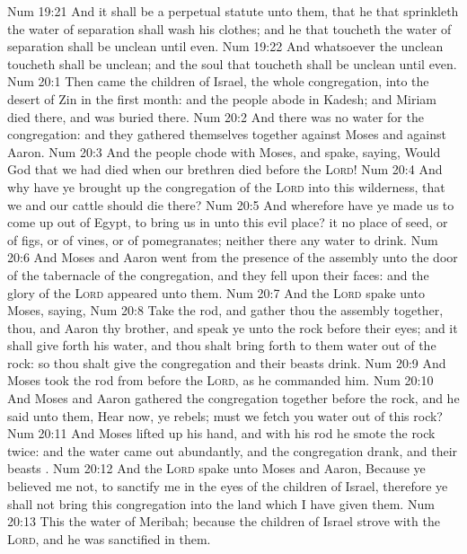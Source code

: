 \vs Num 19:21 And it shall be a perpetual statute unto them, that he that sprinkleth the water of separation shall wash his clothes; and he that toucheth the water of separation shall be unclean until even.
\vs Num 19:22 And whatsoever the unclean  toucheth shall be unclean; and the soul that toucheth  shall be unclean until even.
\vs Num 20:1 Then came the children of Israel,  the whole congregation, into the desert of Zin in the first month: and the people abode in Kadesh; and Miriam died there, and was buried there.
\vs Num 20:2 And there was no water for the congregation: and they gathered themselves together against Moses and against Aaron.
\vs Num 20:3 And the people chode with Moses, and spake, saying, Would God that we had died when our brethren died before the \textsc{Lord}!
\vs Num 20:4 And why have ye brought up the congregation of the \textsc{Lord} into this wilderness, that we and our cattle should die there?
\vs Num 20:5 And wherefore have ye made us to come up out of Egypt, to bring us in unto this evil place? it  no place of seed, or of figs, or of vines, or of pomegranates; neither  there any water to drink.
\vs Num 20:6 And Moses and Aaron went from the presence of the assembly unto the door of the tabernacle of the congregation, and they fell upon their faces: and the glory of the \textsc{Lord} appeared unto them.
\vs Num 20:7 And the \textsc{Lord} spake unto Moses, saying,
\vs Num 20:8 Take the rod, and gather thou the assembly together, thou, and Aaron thy brother, and speak ye unto the rock before their eyes; and it shall give forth his water, and thou shalt bring forth to them water out of the rock: so thou shalt give the congregation and their beasts drink.
\vs Num 20:9 And Moses took the rod from before the \textsc{Lord}, as he commanded him.
\vs Num 20:10 And Moses and Aaron gathered the congregation together before the rock, and he said unto them, Hear now, ye rebels; must we fetch you water out of this rock?
\vs Num 20:11 And Moses lifted up his hand, and with his rod he smote the rock twice: and the water came out abundantly, and the congregation drank, and their beasts .
\vs Num 20:12 And the \textsc{Lord} spake unto Moses and Aaron, Because ye believed me not, to sanctify me in the eyes of the children of Israel, therefore ye shall not bring this congregation into the land which I have given them.
\vs Num 20:13 This  the water of Meribah; because the children of Israel strove with the \textsc{Lord}, and he was sanctified in them.
